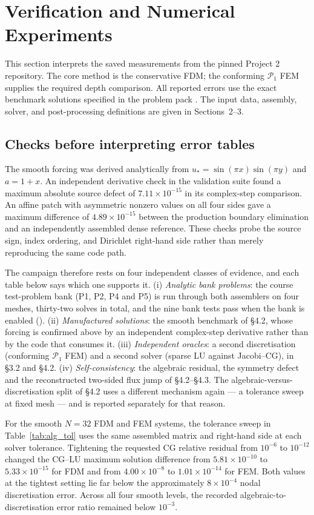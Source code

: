 \section{Verification and Numerical Experiments}
\label{sec:results}

This section interprets the saved measurements from the pinned Project 2
repository. The core method is the conservative FDM; the conforming
$\mathcal P_1$ FEM supplies the required depth comparison. All reported
errors use the exact benchmark solutions specified in the problem pack
\cite{problempack}. The input data, assembly, solver, and post-processing
definitions are given in Sections~2--3.

\subsection{Checks before interpreting error tables}
The smooth forcing was derived analytically from
$u_*=\sin(\pi x)\sin(\pi y)$ and $a=1+x$. An independent derivative check in
the validation suite found a maximum absolute source defect of
$7.11\times10^{-15}$ in its complex-step comparison. An affine patch with
asymmetric nonzero values on all four sides gave a maximum difference of
$4.89\times10^{-15}$ between the production boundary elimination and an
independently assembled dense reference. These checks probe the source sign,
index ordering, and Dirichlet right-hand side rather than merely reproducing
the same code path.

The campaign therefore rests on four independent classes of evidence, and each
table below says which one supports it. (i) \emph{Analytic bank problems}: the
course test-problem bank (P1, P2, P4 and P5) is run through both assemblers on
four meshes, thirty-two solves in total, and the nine bank tests pass when the
bank is enabled (). (ii) \emph{Manufactured
solutions}: the smooth benchmark of \S4.2, whose forcing is confirmed above by an
independent complex-step derivative rather than by the code that consumes it.
(iii) \emph{Independent oracles}: a second discretisation (conforming
$\mathcal P_1$ FEM) and a second solver (sparse LU against Jacobi--CG), in
\S3.2 and \S4.2. (iv) \emph{Self-consistency}: the algebraic residual, the
symmetry defect and the reconstructed two-sided flux jump of
\S4.2--\S4.3. The algebraic-versus-discretisation split of \S4.2 uses a
different mechanism again --- a tolerance sweep at fixed mesh --- and is
reported separately for that reason.

For the smooth $N=32$ FDM and FEM systems, the tolerance sweep in
Table~\ref{tab:alg_tol} uses the same assembled matrix and right-hand side at
each solver tolerance. Tightening the requested CG relative residual from
$10^{-6}$ to $10^{-12}$ changed the CG--LU maximum solution difference from
$5.81\times10^{-10}$ to $5.33\times10^{-15}$ for FDM and from
$4.00\times10^{-8}$ to $1.01\times10^{-14}$ for FEM. Both values at the
tightest setting lie far below the approximately $8\times10^{-4}$ nodal
discretisation error. Across all four smooth levels, the recorded
algebraic-to-discretisation error ratio remained below $10^{-3}$.

